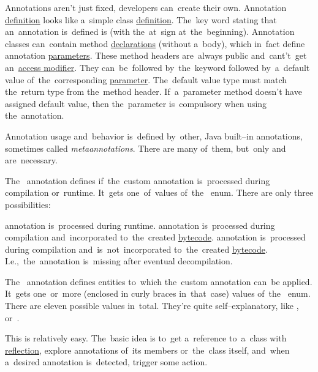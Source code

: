 \label{javacustomannotations}
Annotations aren't just fixed, developers can~create their own.
Annotation \hyperref[declarationdefinition]{definition} looks like a~simple class \hyperref[declarationdefinition]{definition}.
The~key word stating that an~annotation is~defined is  (with the~at~sign at~the~beginning).
Annotation classes can~contain method \hyperref[declarationdefinition]{declarations} (without a~body), which in~fact define annotation \hyperref[parameterargument]{parameters}.
These method headers are~always public and~cant't~get an~\hyperref[javaaccessmodifiers]{access modifier}.
They can~be~followed by~the~keyword  followed by~a~default value of~the~corresponding \hyperref[parameterargument]{parameter}.
The~default value type must match the~return type from the~method header.
If~a~parameter method doesn't have assigned default value, then the~parameter is~compulsory when using the~annotation.

Annotation usage and~behavior is~defined by~other, Java built--in annotations, sometimes called \textit{metaannotations}.
There are many of~them, but~only  and~ are~necessary.

The~ annotation defines if~the~custom annotation is~processed during compilation or~runtime.
It~gets one~of~values of~the~ enum.
There are only three possibilities:
\begin{itemize}
     annotation is~processed during runtime.
     annotation is~processed during compilation and~incorporated to~the~created \hyperref[bytecode]{bytecode}.
     annotation is~processed during compilation and~is~not~incorporated to~the~created \hyperref[bytecode]{bytecode}.
             I.e.,~the~annotation is~missing after eventual decompilation.
\end{itemize}

The~ annotation defines entities to~which the~custom annotation can~be applied.
It~gets one~or~more (enclosed in curly braces in~that~case) values of~the~ enum.
There are eleven possible values in~total.
They're quite self--explanatory, like ,  or~.
\newpage

This is relatively easy.
The~basic idea is to~get a~reference to~a~class with \hyperref[reflection]{reflection}, explore annotations of~its members or~the~class itself, and~when a~desired annotation is~detected, trigger some action.

